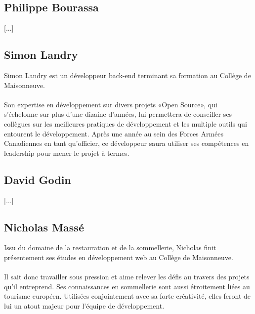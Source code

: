 \documentclass{scrreprt}
\begin{document}
\subsection{Philippe Bourassa}

[...]

\subsection{Simon Landry}

Simon Landry est un développeur back-end terminant sa formation au Collège de
Maisonneuve.

\paragraph{}
Son expertise en développement sur divers projets «Open Source», qui s'échelonne
sur plus d'une dizaine d'années,
lui permettera de conseiller ses collègues sur les meilleures pratiques de
développement et les multiple outils qui entourent le développement.
Après une année au sein des Forces Armées Canadiennes en
tant qu'officier, ce développeur saura utiliser ses
compétences en leadership pour mener le projet à termes.

\subsection{David Godin}

[...]

\subsection{Nicholas Massé}

Issu du domaine de la restauration et de la sommellerie,
Nicholas finit présentement ses études en développement
web au Collège de Maisonneuve.

\paragraph{}
Il sait donc travailler sous pression et aime relever les
défis au travers des projets qu'il entreprend. Ses
connaissances en sommellerie sont aussi étroitement liées
au tourisme européen. Utilisées conjointement avec sa forte créativité, elles
feront de lui un atout majeur pour l'équipe de
développement.
\end{document}
